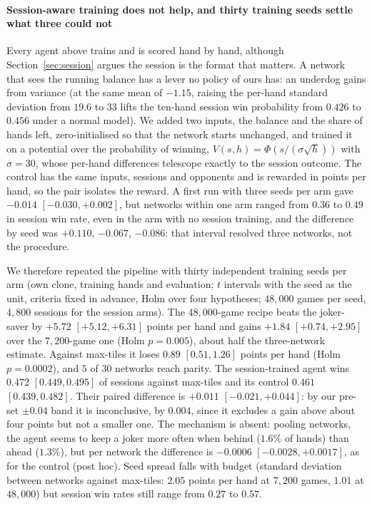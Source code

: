 \documentclass[10pt,journal,compsoc]{IEEEtran}
\begin{document}
\paragraph*{Session-aware training does not help, and thirty training seeds settle what three could not}\label{sec:sessrl}
Every agent above trains and is scored hand by hand, although Section~\ref{sec:session} argues the session is the format that matters. A network that sees the running balance has a lever no policy of ours has: an underdog gains from variance (at the same mean of $-1.15$, raising the per-hand standard deviation from $19.6$ to $33$ lifts the ten-hand session win probability from $0.426$ to $0.456$ under a normal model). We added two inputs, the balance and the share of hands left, zero-initialised so that the network starts unchanged, and trained it on a potential over the probability of winning, $V(s,h)=\Phi(s/(\sigma\sqrt h))$ with $\sigma=30$, whose per-hand differences telescope exactly to the session outcome. The control has the same inputs, sessions and opponents and is rewarded in points per hand, so the pair isolates the reward. A first run with three seeds per arm gave $-0.014$ $[-0.030,+0.002]$, but networks within one arm ranged from $0.36$ to $0.49$ in session win rate, even in the arm with no session training, and the difference by seed was $+0.110$, $-0.067$, $-0.086$: that interval resolved three networks, not the procedure.

We therefore repeated the pipeline with thirty independent training seeds per arm (own clone, training hands and evaluation; $t$ intervals with the seed as the unit, criteria fixed in advance, Holm over four hypotheses; $48{,}000$ games per seed, $4{,}800$ sessions for the session arms). The $48{,}000$-game recipe beats the joker-saver by $+5.72$ $[+5.12,+6.31]$ points per hand and gains $+1.84$ $[+0.74,+2.95]$ over the $7{,}200$-game one (Holm $p=0.005$), about half the three-network estimate. Against max-tiles it loses $0.89$ $[0.51,1.26]$ points per hand (Holm $p=0.0002$), and $5$ of $30$ networks reach parity. The session-trained agent wins $0.472$ $[0.449,0.495]$ of sessions against max-tiles and its control $0.461$ $[0.439,0.482]$. Their paired difference is $+0.011$ $[-0.021,+0.044]$: by our pre-set $\pm0.04$ band it is inconclusive, by $0.004$, since it excludes a gain above about four points but not a smaller one. The mechanism is absent: pooling networks, the agent seems to keep a joker more often when behind ($1.6\%$ of hands) than ahead ($1.3\%$), but per network the difference is $-0.0006$ $[-0.0028,+0.0017]$, as for the control (post hoc). Seed spread falls with budget (standard deviation between networks against max-tiles: $2.05$ points per hand at $7{,}200$ games, $1.01$ at $48{,}000$) but session win rates still range from $0.27$ to $0.57$.
\end{document}

